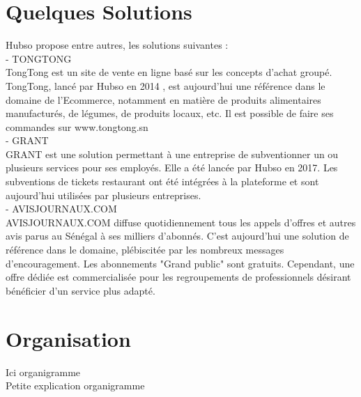 \section{Quelques Solutions}

Hubso propose entre autres, les solutions suivantes : \\
- TONGTONG \\
TongTong est un site de vente en ligne basé sur les concepts d'achat groupé. TongTong, lancé par Hubso en 2014 , est aujourd'hui une référence dans le domaine de l'Ecommerce, notamment en matière de produits alimentaires manufacturés, de légumes, de produits locaux, etc. Il est possible de faire ses commandes sur www.tongtong.sn \\
- GRANT \\
GRANT est une solution permettant à une entreprise de subventionner un ou plusieurs services pour ses employés. Elle a été lancée par Hubso en 2017. Les subventions de tickets restaurant ont été intégrées à la plateforme et sont aujourd'hui utilisées par plusieurs entreprises.\\
- AVISJOURNAUX.COM \\
AVISJOURNAUX.COM diffuse quotidiennement tous les appels d'offres et autres avis parus au Sénégal à ses milliers d'abonnés. C'est aujourd'hui une solution de référence dans le domaine, plébiscitée par les nombreux messages d'encouragement. Les abonnements "Grand public" sont gratuits. Cependant, une offre dédiée est commercialisée pour les regroupements de professionnels désirant bénéficier d'un service plus adapté. 

\section{Organisation}
Ici organigramme \\
Petite explication organigramme
\clearpage